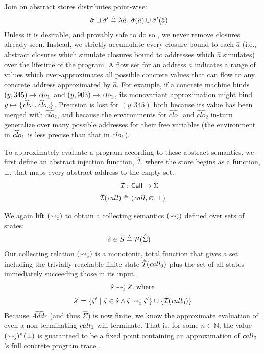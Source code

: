 %
Join on abstract stores distributes point-wise:
%
\begin{align*}
  \hat{\sigma} \sqcup \hat{\sigma}' &\triangleq \lambda \hat{a}.\ \hat{\sigma}(\hat{a}) \cup \hat{\sigma}'(\hat{a})
\end{align*}
%
Unless it is desirable, and provably safe to do so \cite{might:2006:gammacfa}, we never remove closures already seen.
%
Instead, we strictly accumulate every closure bound to each $\hat{a}$ (i.e., abstract closures which simulate closures bound to addresses which $\hat{a}$ simulates)
over the lifetime of the program.
%
A flow set for an address $\hat{a}$ indicates a range of values which over-approximates all possible concrete values that can flow to any 
concrete address approximated by $\hat{a}$.
%
For example, if a concrete machine binds $(y, 345) \mapsto \mathit{clo}_1$ and $(y, 903) \mapsto \mathit{clo}_2$, 
its monovariant approximation might bind $y \mapsto \{ \widehat{\mathit{clo}}_1, \widehat{\mathit{clo}}_2 \}$.
%
Precision is lost for $(y, 345)$ both because its value has been merged with $\widehat{clo}_2$, and because the environments for $\widehat{clo}_1$ and 
$\widehat{clo}_2$ in-turn generalize over many possible addresses for their free variables (the environment in $\widehat{\mathit{clo}}_1$ is less precise than that in $\mathit{clo}_1$).


To approximately evaluate a program according to these abstract semantics, we first define an abstract injection function,
$\hat{\mathcal{I}}$, where the store begins as a function, $\bot$, that maps every abstract address to the empty set.
%
\begin{align*}
 \hat{\mathcal{I}} :&\ \mathsf{Call} \to \hat{\Sigma}
 \\
 \hat{\mathcal{I}}(\mathit{call}) \triangleq&\ (\mathit{call}, \varnothing, \bot)
\end{align*}


We again lift $(\pdTo)$ to obtain a collecting semantics $(\pdToS)$ defined over sets of states:
%
\begin{align*}
  \hat{s} \in \hat{S} &\triangleq \mathcal{P}(\hat{\Sigma})
\end{align*}
%
Our collecting relation $(\pdToS)$ is a monotonic, total function that gives a set including the trivially reachable finite-state $\hat{\mathcal{I}}(\mathit{call}_0)$
plus the set of all states immediately succeeding those in its input. 
%
\begin{align*}
  \hat{s} \pdToS \hat{s}', \text{where}
\end{align*}
\vspace{-0.6cm}
\begin{align*}
  \hat{s}' = \Set{ \hat{\varsigma}'\ \vert\ \hat{\varsigma} \in \hat{s} \wedge \hat{\varsigma} \pdTo \hat{\varsigma}' } \cup \Set{ \hat{\mathcal{I}}(\var{call}_0) }
\end{align*}
%
Because $\widehat{Addr}$ (and thus $\hat{\Sigma}$) is now finite, we know the approximate evaluation of even a non-terminating $\mathit{call}_0$ will terminate.
%
That is, for some $n \in \mathbb{N}$, the value $(\pdToS)^{n}(\bot)$ is guaranteed to be a fixed point containing an approximation of $\mathit{call}_0$'s full concrete program trace
\cite{tarski:1955:fixpoint}.



